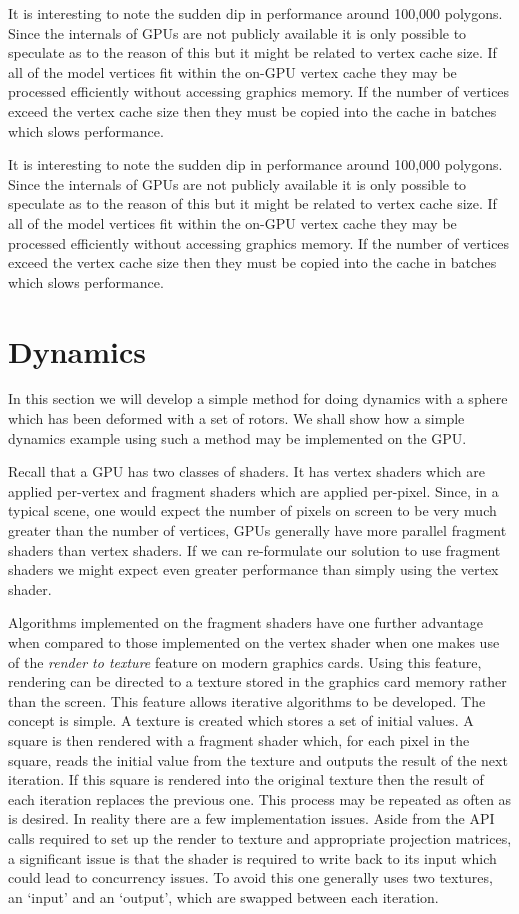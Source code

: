 It is interesting to note the sudden dip in performance around 100,000 polygons. 
Since the internals of GPUs are not publicly available it is only possible to speculate
as to the reason of this but it might be related to vertex cache size. If all of the 
model vertices fit within the on-GPU vertex cache they may be processed efficiently without
accessing graphics memory. If the number of vertices exceed the vertex cache size then
they must be copied into the cache in batches which slows performance.

It is interesting to note the sudden dip in performance around 100,000 polygons. 
Since the internals of GPUs are not publicly available it is only possible to speculate
as to the reason of this but it might be related to vertex cache size. If all of the 
model vertices fit within the on-GPU vertex cache they may be processed efficiently without
accessing graphics memory. If the number of vertices exceed the vertex cache size then
they must be copied into the cache in batches which slows performance.

\section{Dynamics}

In this section we will develop a simple method for doing dynamics with a sphere
which has been deformed with a set of rotors. We shall show how a simple dynamics example
using such a method may be implemented on the GPU.

Recall that a GPU has two classes of shaders. It has vertex shaders which are applied
per-vertex and fragment shaders which are applied per-pixel. Since, in a typical scene,
one would expect the number of pixels on screen to be very much greater than the number
of vertices, GPUs generally have more parallel fragment shaders than vertex shaders.
If we can re-formulate our solution to use fragment shaders we might expect even
greater performance than simply using the vertex shader.

Algorithms implemented on the fragment shaders have one further 
advantage when compared to those implemented on the vertex shader when one makes use
of the \emph{render to texture} feature on modern graphics cards. Using this feature,
rendering can be directed to a texture stored in the graphics card memory rather than the
screen. This feature allows iterative algorithms to be developed.
The concept is simple. A texture is created which stores a set of initial values. 
A square is then rendered with a fragment shader which, for each pixel in the square,
reads the initial value from the texture and outputs the result of the next iteration.
If this square is rendered into the original texture then the result of each iteration
replaces the previous one. This process may be repeated as often as is desired.
In reality there are a few implementation issues. Aside from the API calls required to
set up the render to texture and appropriate projection matrices, a significant issue is
that the shader is required to write back to its input which could lead to
concurrency issues. To avoid this one generally uses two textures, an `input' and an `output',
which are swapped between each iteration.

